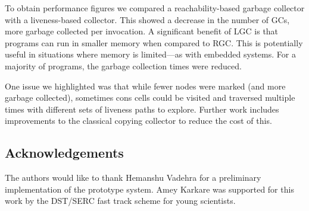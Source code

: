 \documentclass{llncs}
\begin{document}
To obtain performance figures we compared a reachability-based garbage
collector with a liveness-based  collector.  This showed a decrease in
the  number  of  GCs,   more  garbage  collected  per  invocation.   A
significant benefit of LGC is  that programs can run in smaller memory
when compared to  RGC. This is potentially useful  in situations where
memory  is  limited---as with  embedded  systems.  For  a majority  of
programs, the garbage collection times were reduced.

One issue we  highlighted was that while fewer  nodes were marked (and
more garbage collected), sometimes  cons cells could be visited and
traversed  multiple times  with different  sets of  liveness  paths to
explore.  Further work includes  improvements to the classical copying
collector to reduce the cost of this.



\subsection*{Acknowledgements}
The authors  would like  to thank Hemanshu  Vadehra for  a preliminary
implementation of the prototype system. Amey Karkare was supported for
this work by the DST/SERC fast track scheme for young scientists.  

{}

\end{document}
